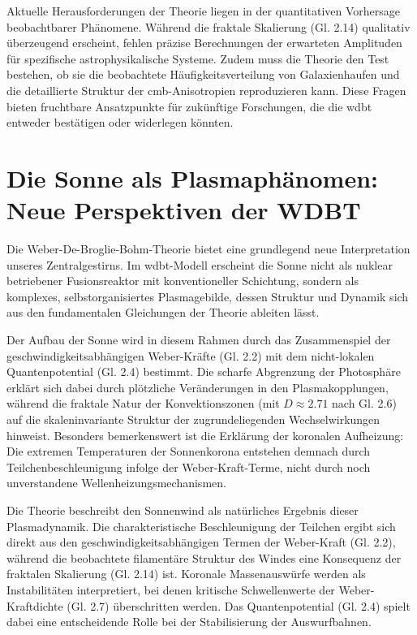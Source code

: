Aktuelle Herausforderungen der Theorie liegen in der quantitativen Vorhersage beobachtbarer Phänomene. Während die fraktale Skalierung (Gl. 2.14) qualitativ überzeugend erscheint,
fehlen präzise Berechnungen der erwarteten Amplituden für spezifische astrophysikalische Systeme. Zudem muss die Theorie den Test bestehen, ob sie die beobachtete
Häufigkeitsverteilung von Galaxienhaufen und die detaillierte Struktur der \gls{cmb}-Anisotropien reproduzieren kann. Diese Fragen bieten fruchtbare Ansatzpunkte für zukünftige
Forschungen, die die \gls{wdbt} entweder bestätigen oder widerlegen könnten.

\section{Die Sonne als Plasmaphänomen: Neue Perspektiven der WDBT}
Die Weber-De-Broglie-Bohm-Theorie bietet eine grundlegend neue Interpretation unseres Zentralgestirns. Im \gls{wdbt}-Modell erscheint die Sonne nicht als nuklear betriebener
Fusionsreaktor mit konventioneller Schichtung, sondern als komplexes, selbstorganisiertes Plasmagebilde, dessen Struktur und Dynamik sich aus den fundamentalen Gleichungen der
Theorie ableiten lässt.

Der Aufbau der Sonne wird in diesem Rahmen durch das Zusammenspiel der geschwindigkeitsabhängigen Weber-Kräfte (Gl. 2.2) mit dem nicht-lokalen Quantenpotential (Gl. 2.4) bestimmt.
Die scharfe Abgrenzung der Photosphäre erklärt sich dabei durch plötzliche Veränderungen in den Plasmakopplungen, während die fraktale Natur der Konvektionszonen
(mit $D \approx 2.71$ nach Gl. 2.6) auf die skaleninvariante Struktur der zugrundeliegenden Wechselwirkungen hinweist. Besonders bemerkenswert ist die Erklärung der koronalen
Aufheizung: Die extremen Temperaturen der Sonnenkorona entstehen demnach durch Teilchenbeschleunigung infolge der Weber-Kraft-Terme, nicht durch noch unverstandene
Wellenheizungsmechanismen.

Die Theorie beschreibt den Sonnenwind als natürliches Ergebnis dieser Plasmadynamik. Die charakteristische Beschleunigung der Teilchen ergibt sich direkt aus den
geschwindigkeitsabhängigen Termen der Weber-Kraft (Gl. 2.2), während die beobachtete filamentäre Struktur des Windes eine Konsequenz der fraktalen Skalierung (Gl. 2.14) ist.
Koronale Massenauswürfe werden als Instabilitäten interpretiert, bei denen kritische Schwellenwerte der Weber-Kraftdichte (Gl. 2.7) überschritten werden. Das Quantenpotential
(Gl. 2.4) spielt dabei eine entscheidende Rolle bei der Stabilisierung der Auswurfbahnen.

